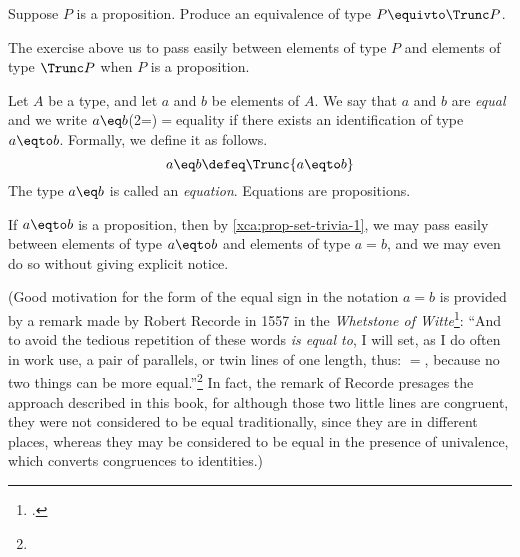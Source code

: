 \begin{xca}\label{xca:prop-set-trivia-1}
  Suppose $P$ is a proposition.  Produce an equivalence of type $P \equivto \Trunc P$.
\end{xca}

The exercise above us to pass easily between elements of type $P$ and elements of type
$\Trunc P$ when $P$ is a proposition.

\begin{definition}
  Let $A$ be a type, and let $a$ and $b$ be elements of $A$.  We say that $a$ and $b$ are \emph{equal} and
  we write $a \eq b$\glossary(2=){$=$}{equality} if there exists an identification of type $a \eqto b$.  Formally, we define it as follows.
  \[
  a \eq b \defeq \Trunc {a \eqto b}
  \]
  The type $a \eq b$ is called an \emph{equation}.  Equations are propositions.
\end{definition}

\begin{remark}
  If $a \eqto b$ is a proposition, then by \cref{xca:prop-set-trivia-1}, we may pass easily between elements of type
  $a \eqto b$ and elements of type $a = b$, and we may even do so without giving explicit notice.
\end{remark}

(Good motivation for the form of the equal sign in the notation $a=b$ is provided by a remark made by Robert Recorde in 1557 in the \emph{Whetstone of Witte}\footcite{WhetstoneOfWitte}:
``And to avoid the tedious repetition of these words \emph{is equal to}, I will set,
as I do often in work use, a pair of parallels, or twin lines of one length, thus: $=$,
because no two things can be more equal.''\footnote{}
In fact, the remark of Recorde presages the approach described in this book, for although those two little lines are congruent,
they were not considered to be equal traditionally, since they are in different places, whereas they may be considered to be equal in the presence of univalence,
which converts congruences to identities.)

